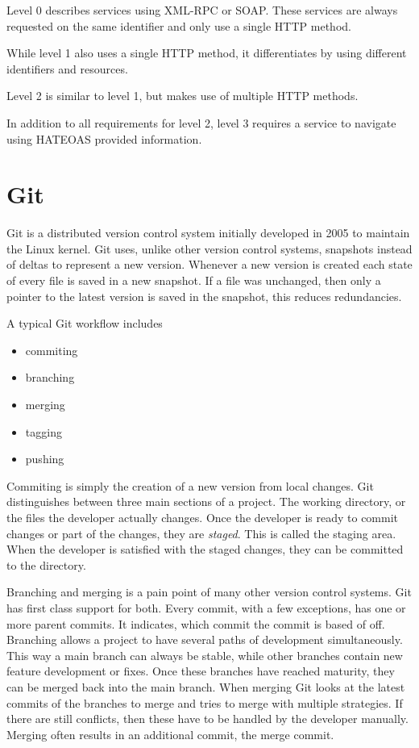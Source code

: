 Level 0 describes services using XML-RPC or SOAP. These services are always
requested on the same identifier and only use a single HTTP method.

While level 1 also uses a single HTTP method, it differentiates by using
different identifiers and resources.

Level 2 is similar to level 1, but makes use of multiple HTTP methods.

In addition to all requirements for level 2, level 3 requires a service to
navigate using HATEOAS provided information.

\cite{rmm}

\section{Git}

Git is a distributed version control system initially developed in 2005 to
maintain the Linux kernel. Git uses, unlike other version control systems,
snapshots instead of deltas to represent a new version. Whenever a new version
is created each state of every file is saved in a new snapshot. If a file was
unchanged, then only a pointer to the latest version is saved in the snapshot,
this reduces redundancies.

A typical Git workflow includes

\begin{itemize}
  \item{commiting}
  \item{branching}
  \item{merging}
  \item{tagging}
  \item{pushing}
\end{itemize}

Commiting is simply the creation of a new version from local changes. Git
distinguishes between three main sections of a project. The working directory,
or the files the developer actually changes. Once the developer is ready to
commit changes or part of the changes, they are \textit{staged}. This is called
the staging area. When the developer is satisfied with the staged changes,
they can be committed to the directory.

Branching and merging is a pain point of many other version control systems. Git
has first class support for both. Every commit, with a few exceptions, has one
or more parent commits. It indicates, which commit the commit is based of off.
Branching allows a project to have several paths of development simultaneously.
This way a main branch can always be stable, while other branches contain new
feature development or fixes. Once these branches have reached maturity, they
can be merged back into the main branch. When merging Git looks at the latest
commits of the branches to merge and tries to merge with multiple strategies.
If there are still conflicts, then these have to be handled by the developer
manually. Merging often results in an additional commit, the merge commit.

